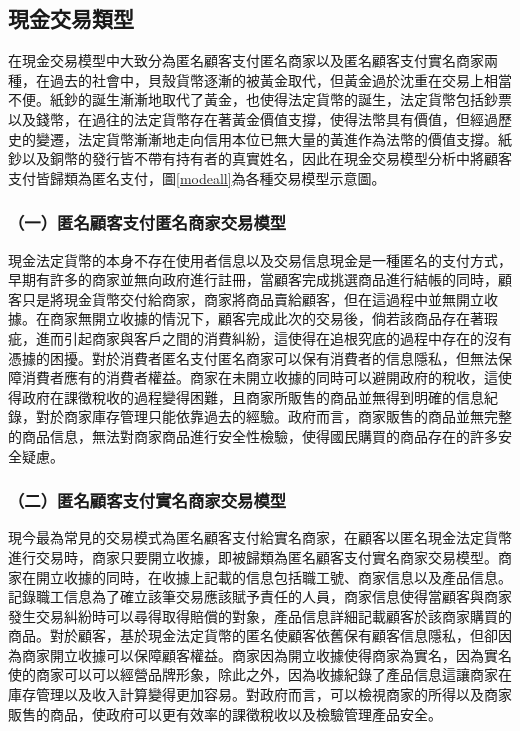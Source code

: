 	\subsection{現金交易類型}
	在現金交易模型中大致分為匿名顧客支付匿名商家以及匿名顧客支付實名商家兩種，在過去的社會中，貝殼貨幣逐漸的被黃金取代，但黃金過於沈重在交易上相當不便。紙鈔的誕生漸漸地取代了黃金，也使得法定貨幣的誕生，法定貨幣包括鈔票以及錢幣，在過往的法定貨幣存在著黃金價值支撐，使得法幣具有價值，但經過歷史的變遷，法定貨幣漸漸地走向信用本位已無大量的黃進作為法幣的價值支撐。紙鈔以及銅幣的發行皆不帶有持有者的真實姓名，因此在現金交易模型分析中將顧客支付皆歸類為匿名支付，圖\ref{modeall}為各種交易模型示意圖。

		\subsubsection{（一）匿名顧客支付匿名商家交易模型}
		現金法定貨幣的本身不存在使用者信息以及交易信息現金是一種匿名的支付方式，早期有許多的商家並無向政府進行註冊，當顧客完成挑選商品進行結帳的同時，顧客只是將現金貨幣交付給商家，商家將商品賣給顧客，但在這過程中並無開立收據。在商家無開立收據的情況下，顧客完成此次的交易後，倘若該商品存在著瑕疵，進而引起商家與客戶之間的消費糾紛，這使得在追根究底的過程中存在的沒有憑據的困擾。對於消費者匿名支付匿名商家可以保有消費者的信息隱私，但無法保障消費者應有的消費者權益。商家在未開立收據的同時可以避開政府的稅收，這使得政府在課徵稅收的過程變得困難，且商家所販售的商品並無得到明確的信息紀錄，對於商家庫存管理只能依靠過去的經驗。政府而言，商家販售的商品並無完整的商品信息，無法對商家商品進行安全性檢驗，使得國民購買的商品存在的許多安全疑慮。

		\subsubsection{（二）匿名顧客支付實名商家交易模型}
		現今最為常見的交易模式為匿名顧客支付給實名商家，在顧客以匿名現金法定貨幣進行交易時，商家只要開立收據，即被歸類為匿名顧客支付實名商家交易模型。商家在開立收據的同時，在收據上記載的信息包括職工號、商家信息以及產品信息。記錄職工信息為了確立該筆交易應該賦予責任的人員，商家信息使得當顧客與商家發生交易糾紛時可以尋得取得賠償的對象，產品信息詳細記載顧客於該商家購買的商品。對於顧客，基於現金法定貨幣的匿名使顧客依舊保有顧客信息隱私，但卻因為商家開立收據可以保障顧客權益。商家因為開立收據使得商家為實名，因為實名使的商家可以可以經營品牌形象，除此之外，因為收據紀錄了產品信息這讓商家在庫存管理以及收入計算變得更加容易。對政府而言，可以檢視商家的所得以及商家販售的商品，使政府可以更有效率的課徵稅收以及檢驗管理產品安全。

